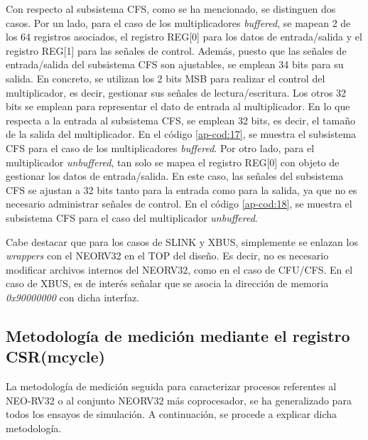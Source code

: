 Con respecto al subsistema CFS, como se ha mencionado, se distinguen dos casos. 
Por un lado, para el caso de los multiplicadores \textit{buffered}, se mapean 2 de los 64 registros asociados, el registro REG[0] para los datos de entrada/salida y el registro REG[1] para las señales de control.
Además, puesto que las señales de entrada/salida del subsistema CFS son ajustables, se emplean 34 bits para su salida.
En concreto, se utilizan los 2 bits MSB para realizar el control del multiplicador, es decir, gestionar sus señales de lectura/escritura.
Los otros 32 bits se emplean para representar el dato de entrada al multiplicador.
En lo que respecta a la entrada al subsistema CFS, se emplean 32 bits, es decir, el tamaño de la salida del multiplicador.
En el código \ref{ap-cod:17}, se muestra el subsistema CFS para el caso de los multiplicadores \textit{buffered}.
Por otro lado, para el multiplicador \textit{unbuffered}, tan solo se mapea el registro REG[0] con objeto de gestionar los datos de entrada/salida.
En este caso, las señales del subsistema CFS se ajustan a 32 bits tanto para la entrada como para la salida, ya que no es necesario administrar señales de control.
En el código \ref{ap-cod:18}, se muestra el subsistema CFS para el caso del multiplicador \textit{unbuffered}.

Cabe destacar que para los casos de SLINK y XBUS, simplemente se enlazan los \textit{wrappers} con el NEORV32 en el TOP del diseño. 
Es decir, no es necesario modificar archivos internos del NEORV32, como en el caso de CFU/CFS.
En el caso de XBUS, es de interés señalar que se asocia la dirección de memoria \textit{0x90000000} con dicha interfaz. 

\subsection{Metodología de medición mediante el registro CSR(mcycle)}

\label{met}



La metodología de medición seguida para caracterizar procesos referentes al NEO-RV32 o al conjunto NEORV32 más coprocesador, se ha generalizado para todos los ensayos de simulación.
A continuación, se procede a explicar dicha metodología.

